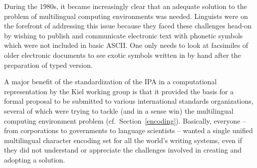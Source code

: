 During the 1980s, it became increasingly clear that an adequate solution 
to the problem of multilingual computing environments was needed. Linguists 
were on the forefront of addressing this issue because they faced these 
challenges head-on by wishing to publish and communicate electronic text 
with phonetic symbols which were not included in basic ASCII. One 
only needs to look at facsimiles of older electronic documents to see exotic 
symbols written in by hand after the preparation of typed version.




A major benefit of the standardization of the IPA in a computational
representation by the Kiel working group is that it provided the basis for a
formal proposal to be submitted to various international standards
organizations, several of which were trying to tackle (and in a sense win) the
multilingual computing environment problem (cf.\ Section~\ref{encoding}).
Basically, everyone -- from corporations to governments to language scientists
-- wanted a single unified multilingual character encoding set for all the
world's writing systems, even if they did not understand or appreciate the
challenges involved in creating and adopting a solution.

